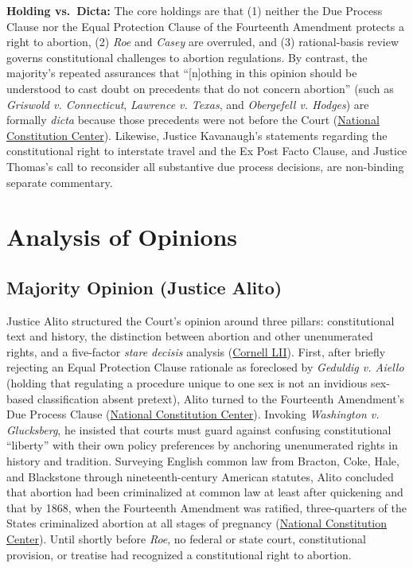 \documentclass[12pt]{article}
\begin{document}
\textbf{Holding vs.\ Dicta:} The core holdings are that (1) neither the Due Process Clause nor the Equal Protection Clause of the Fourteenth Amendment protects a right to abortion, (2) \textit{Roe} and \textit{Casey} are overruled, and (3) rational-basis review governs constitutional challenges to abortion regulations. By contrast, the majority's repeated assurances that ``[n]othing in this opinion should be understood to cast doubt on precedents that do not concern abortion'' (such as \textit{Griswold v. Connecticut}, \textit{Lawrence v. Texas}, and \textit{Obergefell v. Hodges}) are formally \textit{dicta} because those precedents were not before the Court (\href{https://constitutioncenter.org/the-constitution/supreme-court-case-library/dobbs-v-jackson-womens-health-organization}{National Constitution Center}). Likewise, Justice Kavanaugh's statements regarding the constitutional right to interstate travel and the Ex Post Facto Clause, and Justice Thomas's call to reconsider all substantive due process decisions, are non-binding separate commentary.

\section{Analysis of Opinions}

\subsection{Majority Opinion (Justice Alito)}

Justice Alito structured the Court's opinion around three pillars: constitutional text and history, the distinction between abortion and other unenumerated rights, and a five-factor \textit{stare decisis} analysis (\href{https://www.law.cornell.edu/supremecourt/text/19-1392}{Cornell LII}). First, after briefly rejecting an Equal Protection Clause rationale as foreclosed by \textit{Geduldig v. Aiello} (holding that regulating a procedure unique to one sex is not an invidious sex-based classification absent pretext), Alito turned to the Fourteenth Amendment's Due Process Clause (\href{https://constitutioncenter.org/the-constitution/supreme-court-case-library/dobbs-v-jackson-womens-health-organization}{National Constitution Center}). Invoking \textit{Washington v. Glucksberg}, he insisted that courts must guard against confusing constitutional ``liberty'' with their own policy preferences by anchoring unenumerated rights in history and tradition. Surveying English common law from Bracton, Coke, Hale, and Blackstone through nineteenth-century American statutes, Alito concluded that abortion had been criminalized at common law at least after quickening and that by 1868, when the Fourteenth Amendment was ratified, three-quarters of the States criminalized abortion at all stages of pregnancy (\href{https://constitutioncenter.org/the-constitution/supreme-court-case-library/dobbs-v-jackson-womens-health-organization}{National Constitution Center}). Until shortly before \textit{Roe}, no federal or state court, constitutional provision, or treatise had recognized a constitutional right to abortion.
\end{document}
